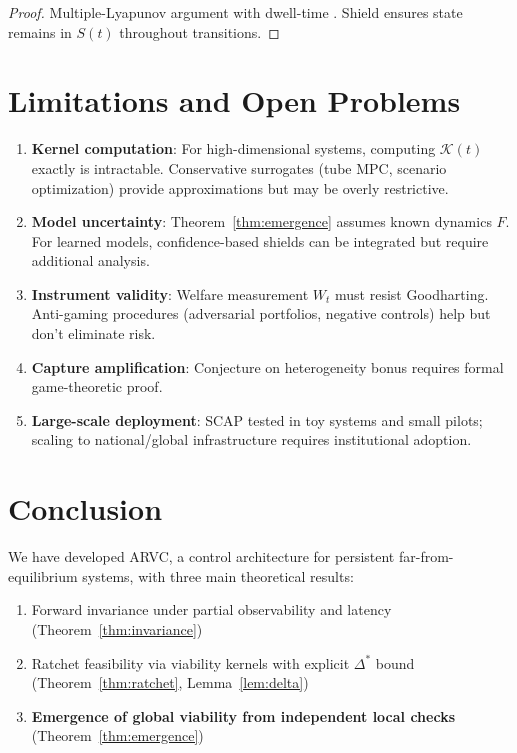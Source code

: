 \documentclass[11pt,a4paper]{article}
\begin{document}
\begin{proof}
Multiple-Lyapunov argument with dwell-time \cite{liberzon2003switching}. Shield ensures state remains in $S(t)$ throughout transitions.
\end{proof}

\section{Limitations and Open Problems}

\begin{enumerate}
\item \textbf{Kernel computation}: For high-dimensional systems, computing $\mathcal{K}(t)$ exactly is intractable. Conservative surrogates (tube MPC, scenario optimization) provide approximations but may be overly restrictive.
\item \textbf{Model uncertainty}: Theorem~\ref{thm:emergence} assumes known dynamics $F$. For learned models, confidence-based shields \cite{berkenkamp2017safe} can be integrated but require additional analysis.
\item \textbf{Instrument validity}: Welfare measurement $W_t$ must resist Goodharting. Anti-gaming procedures (adversarial portfolios, negative controls) help but don't eliminate risk.
\item \textbf{Capture amplification}: Conjecture on heterogeneity bonus requires formal game-theoretic proof.
\item \textbf{Large-scale deployment}: SCAP tested in toy systems and small pilots; scaling to national/global infrastructure requires institutional adoption.
\end{enumerate}

\section{Conclusion}

We have developed ARVC, a control architecture for persistent far-from-equilibrium systems, with three main theoretical results:
\begin{enumerate}
\item Forward invariance under partial observability and latency (Theorem~\ref{thm:invariance})
\item Ratchet feasibility via viability kernels with explicit $\Delta^*$ bound (Theorem~\ref{thm:ratchet}, Lemma~\ref{lem:delta})
\item \textbf{Emergence of global viability from independent local checks} (Theorem~\ref{thm:emergence})
\end{enumerate}
\end{document}
